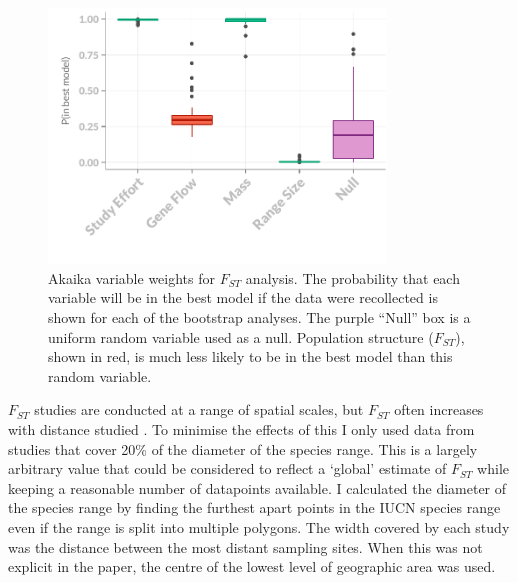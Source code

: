 \begin{knitrout}\footnotesize
{}\color{fgcolor}\begin{figure}[t]

{\centering \includegraphics[width=0.8\textwidth]{figure/fstITPlots-1} 

}

\caption[Akaika variable weights for $F_{ST}$ analysis.]{Akaika variable weights for $F_{ST}$ analysis. The probability that each variable will be in the best model if the data were recollected is shown for each of the bootstrap analyses. The purple ``Null'' box is a uniform random variable used as a null. Population structure ($F_{ST}$), shown in red, is much less likely to be in the best model than this random variable.}\label{fig:fstITPlots}
\end{figure}


\end{knitrout}















$F_{ST}$ studies are conducted at a range of spatial scales, but $F_{ST}$ often increases with distance studied \cite{}.
To minimise the effects of this I only used data from studies that cover 20\% of the diameter of the species range.
This is a largely arbitrary value that could be considered to reflect a `global' estimate of $F_{ST}$ while keeping a reasonable number of datapoints available.
I calculated the diameter of the species range by finding the furthest apart points in the IUCN species range \cite{} even if the range is split into multiple polygons.
The width covered by each study was the distance between the most distant sampling sites.
When this was not explicit in the paper, the centre of the lowest level of geographic area was used.



